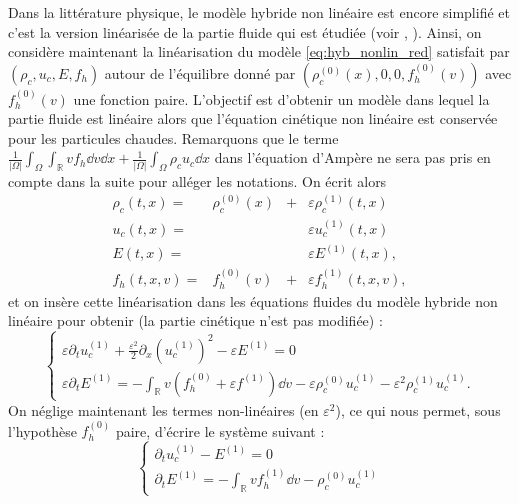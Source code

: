Dans la littérature physique, le modèle hybride non linéaire est encore simplifié et c'est la version linéarisée de la partie fluide qui est étudiée (voir \cite{Holderied:2019}, \cite{Tronci:2014}). Ainsi, on considère maintenant la linéarisation du modèle \eqref{eq:hyb_nonlin_red} satisfait par $(\rho_c, u_c, E, f_h)$ autour de l'équilibre donné par  $(\rho_c^{(0)}(x), 0, 0, f^{(0)}_h(v))$ avec $f^{(0)}_h(v)$ une fonction paire. L'objectif est d'obtenir un modèle dans lequel la partie fluide est linéaire alors que l'équation cinétique non linéaire  est conservée pour les particules chaudes. Remarquons que le terme $\frac{1}{|\Omega|}\int_\Omega \int_{\mathbb{R}} vf_h \dd{v}\dd{x}+ \frac{1}{|\Omega|}\int_\Omega \rho_cu_c \dd{x}$ dans l'équation d'Ampère ne sera pas pris en compte dans la suite pour alléger les notations. 
On écrit alors
\begin{equation}
  \begin{aligned}
    \rho_c(t,x) = & \rho_c^{(0)}(x) & + & \varepsilon\rho_c^{(1)}(t,x) \\
    u_c(t,x)    = &                 &   & \varepsilon u_c^{(1)}(t,x) \\
    E(t,x)      = &                 &   & \varepsilon E^{(1)}(t,x), \\
    f_h(t,x, v)   = &  f^{(0)}_h(v)   & + & \varepsilon f_h^{(1)}(t,x,v), 
  \end{aligned}
  \label{eq:lin_variables}
\end{equation}
et on insère cette linéarisation dans les équations fluides du modèle hybride non linéaire pour obtenir (la partie cinétique n'est pas modifiée) :
$$
  \begin{cases}
    \varepsilon \partial_t u_c^{(1)}
      + \frac{\varepsilon^2}{2}\partial_x\left(u_c^{(1)}\right)^2
      - \varepsilon E^{(1)} = 0 \\
    \varepsilon\partial_t E^{(1)} = -\int_{\mathbb{R}} v(f_h^{(0)} + \varepsilon f^{(1)} )\dd{v}
      - \varepsilon\rho_c^{(0)}u_c^{(1)} - \varepsilon^2\rho_c^{(1)}u_c^{(1)}. 
  \end{cases}
$$
On néglige maintenant les termes non-linéaires (en $\varepsilon^2$), ce qui nous permet, sous l'hypothèse $f_{h}^{(0)}$ paire, d'écrire le système suivant :
$$
  \begin{cases}
    \partial_t u_c^{(1)} -  E^{(1)} = 0 \\
    \partial_t E^{(1)} = -\int_{\mathbb{R}} vf^{(1)}_h\dd{v} - \rho_c^{(0)}u_c^{(1)}
  \end{cases}
$$

